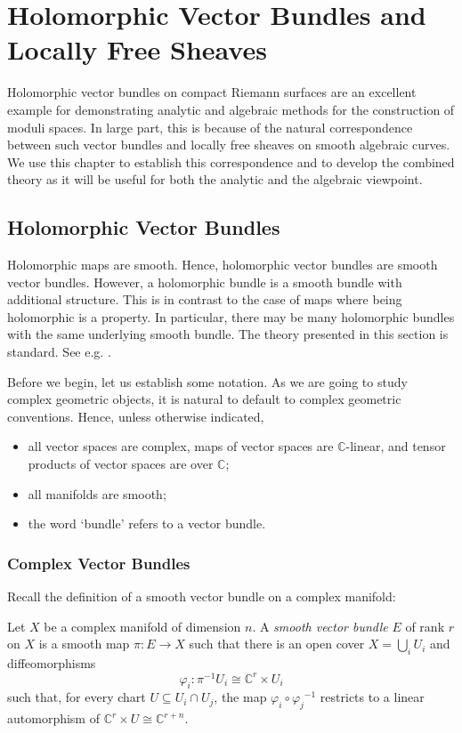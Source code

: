 \documentclass[12pt]{ociamthesis}  %
\begin{document}
\chapter{Holomorphic Vector Bundles and Locally Free Sheaves}

Holomorphic vector bundles on compact Riemann surfaces are an excellent
example for demonstrating analytic and algebraic methods for 
the construction of moduli spaces. In large part, this is because
of the natural correspondence between such vector bundles and
locally free sheaves on smooth algebraic curves. We use this
chapter to establish this correspondence and to develop the combined
theory as it will be useful for both the analytic and the algebraic
viewpoint.


\section{Holomorphic Vector Bundles}

Holomorphic maps are smooth. Hence, holomorphic vector bundles
are smooth vector bundles. However, a holomorphic bundle is a 
smooth bundle with additional structure. This is in contrast to
the case of maps where being holomorphic is a property. In particular,
there may be many holomorphic bundles with
the same underlying smooth bundle. The theory presented
in this section is standard. See e.g. \cite{moroianu2004}.

Before we begin, let us establish some notation. As we are going to study
complex geometric objects, it is natural to default to complex
geometric conventions. Hence, unless otherwise indicated,
\begin{itemize}
  \item all vector spaces are complex, maps of vector spaces are
        $\mathbb{C}$-linear, and tensor products of vector spaces are
        over $\mathbb{C}$;
  \item all manifolds are smooth;
  \item the word `bundle' refers to a vector bundle.
\end{itemize}

\subsection{Complex Vector Bundles}

Recall the definition of a smooth vector bundle on a complex manifold:

\begin{definition}\label{def:complex_bundle}
  Let $X$ be a complex manifold of dimension $n$. A
  \emph{smooth vector bundle} $E$ of rank $r$ on $X$ is a smooth map
  $\pi : E\to X$ such that there
  is an open cover $X = \bigcup_i U_i$ and diffeomorphisms
  \begin{equation}\label{eq:smooth_trivialisation}
    \varphi_i : {\pi}^{-1}U_i \cong \mathbb{C}^r \times U_i
  \end{equation}
  such that, for every chart $U\subseteq U_i\cap U_j$, the
  map $\varphi_i \circ {\varphi_j}^{-1}$ restricts to a linear
  automorphism of $\mathbb{C}^r\times U \cong \mathbb{C}^{r+n}$.
\end{definition}
\end{document}
